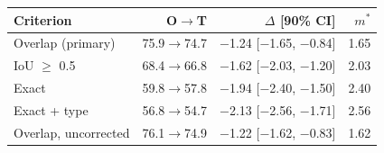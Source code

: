\begin{tabular}{lrrr}
\toprule
Criterion & O$\rightarrow$T & $\Delta$ [90\% CI] & $m^\ast$\\
\midrule
Overlap (primary) & 75.9$\rightarrow$74.7 & $-$1.24 [$-$1.65, $-$0.84] & 1.65\\
IoU $\geq$ 0.5 & 68.4$\rightarrow$66.8 & $-$1.62 [$-$2.03, $-$1.20] & 2.03\\
Exact & 59.8$\rightarrow$57.8 & $-$1.94 [$-$2.40, $-$1.50] & 2.40\\
Exact + type & 56.8$\rightarrow$54.7 & $-$2.13 [$-$2.56, $-$1.71] & 2.56\\
\midrule
Overlap, uncorrected & 76.1$\rightarrow$74.9 & $-$1.22 [$-$1.62, $-$0.83] & 1.62\\
\bottomrule
\end{tabular}
